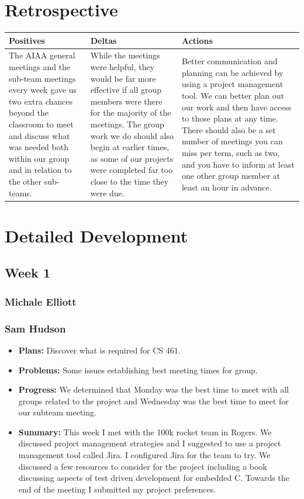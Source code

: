 \documentclass[onecolumn, draftclsnofoot,10pt, compsoc]{IEEEtran}
\begin{document}
\section {Retrospective}
\begin {center}
 \begin {tabular} { | p{5cm} | p{5cm} | p{5cm} | }
 \hline
 Positives & Deltas & Actions \\
 \hline
 The AIAA general meetings and the sub-team meetings every week gave us two extra chances beyond the classroom to meet and discuss what was needed both within our group and in relation to the other sub-teams. & While the meetings were helpful, they would be far more effective if all group members were there for the majority of the meetings. The group work we do should also begin at earlier times, as some of our projects were completed far too close to the time they were due. & Better communication and planning can be achieved by using a project management tool. We can better plan out our work and then have access to those plans at any time. There should also be a set number of meetings you can miss per term, such as two, and you have to inform at least one other group member at least an hour in advance. \\
 \hline
 \end {tabular}
\end {center} 
\section {Detailed Development}
\subsection {Week 1}
\subsubsection{Michale Elliott}
\subsubsection{Sam Hudson}
\begin {itemize}
\item \textbf{Plans: }Discover what is required for CS 461.
\item \textbf{Problems: }Some issues establishing best meeting times for group.
\item \textbf{Progress: }We determined that Monday was the best time to meet with all groups related to the project and Wednesday was the best time to meet for our subteam meeting.
\item \textbf{Summary: }This week I met with the 100k rocket team in Rogers. We discussed project management strategies and I suggested to use a project management tool called Jira. I configured Jira for the team to try. We discussed a few resources to consider for the project including a book discussing aspects of test driven development for embedded C. Towards the end of the meeting I submitted my project preferences. 
\end {itemize}
\end{document}
